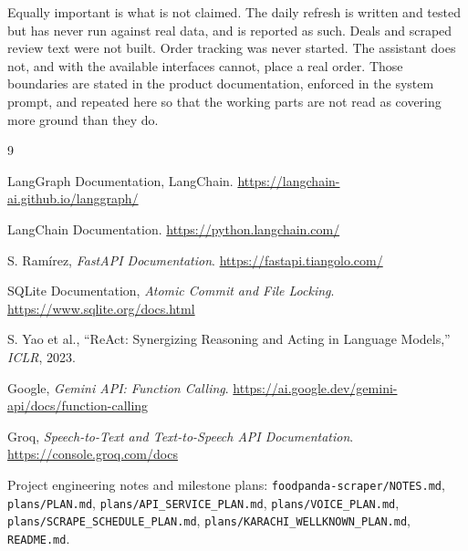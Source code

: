 \documentclass[11pt,a4paper]{article}
\begin{document}
Equally important is what is not claimed. The daily refresh is written and
tested but has never run against real data, and is reported as such. Deals and
scraped review text were not built. Order tracking was never started. The
assistant does not, and with the available interfaces cannot, place a real
order. Those boundaries are stated in the product documentation, enforced in
the system prompt, and repeated here so that the working parts are not read as
covering more ground than they do.

\begin{thebibliography}{9}

 LangGraph Documentation, LangChain.
  \url{https://langchain-ai.github.io/langgraph/}

 LangChain Documentation.
  \url{https://python.langchain.com/}

 S. Ram\'irez, \emph{FastAPI Documentation}.
  \url{https://fastapi.tiangolo.com/}

 SQLite Documentation, \emph{Atomic Commit and File Locking}.
  \url{https://www.sqlite.org/docs.html}

 S. Yao et al., ``ReAct: Synergizing Reasoning and Acting in
  Language Models,'' \emph{ICLR}, 2023.

 Google, \emph{Gemini API: Function Calling}.
  \url{https://ai.google.dev/gemini-api/docs/function-calling}

 Groq, \emph{Speech-to-Text and Text-to-Speech API Documentation}.
  \url{https://console.groq.com/docs}

 Project engineering notes and milestone plans:
  \texttt{foodpanda-scraper/NOTES.md}, \texttt{plans/PLAN.md},
  \texttt{plans/API\_SERVICE\_PLAN.md}, \texttt{plans/VOICE\_PLAN.md},
  \texttt{plans/SCRAPE\_SCHEDULE\_PLAN.md},
  \texttt{plans/KARACHI\_WELLKNOWN\_PLAN.md}, \texttt{README.md}.

\end{thebibliography}
\end{document}
